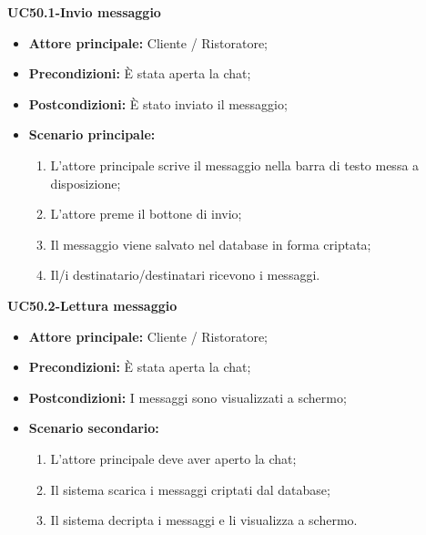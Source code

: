 \textbf{UC50.1-Invio messaggio}
\begin{itemize}
\item \textbf{Attore principale:} Cliente / Ristoratore;
\item \textbf{Precondizioni:} È stata aperta la chat;
\item \textbf{Postcondizioni:} È stato inviato il messaggio;
\item \textbf{Scenario principale:}
\begin{enumerate}
    \item L'attore principale scrive il messaggio nella barra di testo messa a disposizione;
    \item L'attore preme il bottone di invio;
    \item Il messaggio viene salvato nel database in forma criptata;
    \item Il/i destinatario/destinatari ricevono i messaggi.
\end{enumerate}
\end{itemize}

\textbf{UC50.2-Lettura messaggio}
\begin{itemize}
\item \textbf{Attore principale:} Cliente / Ristoratore;
\item \textbf{Precondizioni:} È stata aperta la chat;
\item \textbf{Postcondizioni:} I messaggi sono visualizzati a schermo;
\item \textbf{Scenario secondario:}
\begin{enumerate}
    \item L'attore principale deve aver aperto la chat;
    \item Il sistema scarica i messaggi criptati dal database;
    \item Il sistema decripta i messaggi e li visualizza a schermo.
\end{enumerate}
\end{itemize}
